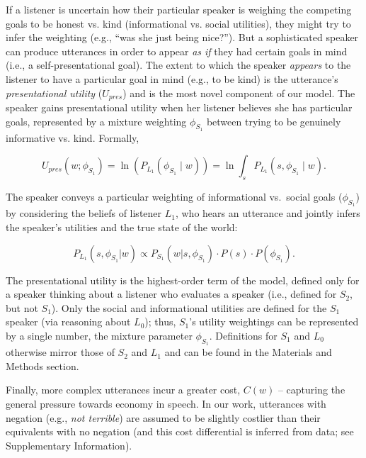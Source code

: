 \documentclass[9pt,twocolumn,twoside,lineno]{main_class_file}
\begin{document}
If a listener is uncertain how their particular speaker is weighing the competing goals to be honest vs. kind (informational vs. social utilities), they might try to infer the weighting (e.g., ``was she just being nice?'').
But a sophisticated speaker can produce utterances in order to appear \emph{as if} they had certain goals in mind (i.e., a self-presentational goal).
The extent to which the speaker \emph{appears} to the listener to have a particular goal in mind (e.g., to be kind) is the utterance's \emph{presentational utility} (\(U_{pres}\)) and is the most novel component of our model.
The speaker gains presentational utility when her listener believes she
has particular goals, represented by a mixture weighting \(\phi_{S_1}\) between trying to be genuinely informative vs. kind.
Formally,

\begin{equation}
U_{pres}(w; \phi_{S_1}) = \ln(P_{L_1}(\phi_{S_1} \mid w)) = \ln \int_s P_{L_1}(s, \phi_{S_1} \mid w).
\end{equation}

\noindent The speaker conveys a particular weighting of informational
vs.~social goals (\(\phi_{S_1}\)) by considering the
beliefs of listener \(L_1\), who hears an utterance and jointly infers
the speaker's utilities and the true state of the world:

\begin{equation}
P_{L_1}(s, \phi_{S_1} | w) \propto P_{S_1}(w | s, \phi_{S_1}) \cdot P(s) \cdot P(\phi_{S_1}).
\end{equation}

\noindent The presentational utility is the highest-order term of the model, defined only for a speaker thinking about a listener who evaluates a speaker
(i.e., defined for \(S_2\), but not \(S_1\)).
Only the social and informational utilities are defined for the \(S_1\) speaker (via reasoning about \(L_0\)); thus, \(S_1\)'s utility weightings can be represented by a single number, the mixture parameter \(\phi_{S_1}\).
Definitions for \(S_1\) and  \(L_0\) otherwise mirror those of  \(S_2\) and  \(L_1\) and can be found in the Materials and Methods section.

Finally, more complex utterances incur a greater cost, \(C(w)\) --
capturing the general pressure towards economy in speech. In our work,
utterances with negation (e.g., \emph{not terrible}) are assumed to
be slightly costlier than their equivalents with no negation (and this cost differential is inferred
from data; see Supplementary Information).
\end{document}
